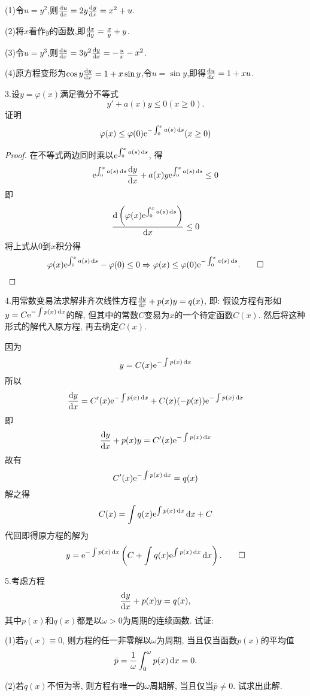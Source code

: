 \begin{solve}
(1)令$u=y^2$,则$\frac{\diff u}{\diff x}=2y\frac{\diff y}{\diff x}=x^2+u$.

(2)将$x$看作$y$的函数,即$\frac{\diff x}{\diff y}=\frac{x}{y}+y$.

(3)令$u=y^3$,则$\frac{\diff u}{\diff x}=3y^2\frac{\diff y}{\diff x}=-\frac{u}{x}-x^2$.

(4)原方程变形为$\cos y\frac{\diff y}{\diff x}=1+x\sin y$,令$u=\sin y$,即得$\frac{\diff u}{\diff x}=1+xu$.
\end{solve}


3.设$y=\varphi(x)$满足微分不等式
\[y'+a(x)y\leq0(x\geq0).\]
证明\[\varphi(x)\leq\varphi(0)\e^{-\int_0^xa(s)\diff s}(x\geq0)\]
\begin{proof} 
在不等式两边同时乘以$\e^{\int_0^xa(s)\diff s}$, 得
\[\e^{\int_0^xa(s)\diff s}\frac{\diff y}{\diff x}+a(x)y\e^{\int_0^xa(s)\diff s}\leq0\]
即\[\frac{\diff\left(\varphi(x)\e^{\int_0^xa(s)\diff s}\right)}{\diff x}\leq0\]
将上式从0到$x$积分得\[\varphi(x)\e^{\int_0^xa(s)\diff s}-\varphi(0)\leq0\Rightarrow\varphi(x)\leq\varphi(0)\e^{-\int_0^xa(s)\diff s}.\qedhere\]
\end{proof}


4.用常数变易法求解非齐次线性方程$\frac{\diff y}{\diff x}+p(x)y=q(x)$, 即: 
假设方程有形如$y=C\e^{-\int p(x)\diff x}$的解, 但其中的常数$C$变易为$x$的一个待定函数$C(x)$. 
然后将这种形式的解代入原方程, 再去确定$C(x)$.

\begin{solve}
因为\[y=C(x)\e^{-\int p(x)\diff x}\]
所以\[\frac{\diff y}{\diff x}=C'(x)\e^{-\int p(x)\diff x}+C(x)(-p(x))\e^{-\int p(x)\diff x}\]
即\[\frac{\diff y}{\diff x}+p(x)y=C'(x)\e^{-\int p(x)\diff x}\]
故有
\[C'(x)\e^{-\int p(x)\diff x}=q(x)\]
解之得\[C(x)=\int q(x)\e^{\int p(x)\diff x}\diff x+C\]
代回即得原方程的解为\[y=\e^{-\int p(x)\diff x}\left(C+\int q(x)\e^{\int p(x)\diff x}\diff x\right).\qedhere\]
\end{solve}


5.考虑方程
\[\frac{\diff y}{\diff x}+p(x)y=q(x),\]
其中$p(x)$和$q(x)$都是以$\omega>0$为周期的连续函数. 试证:

(1)若$q(x)\equiv0$, 则方程的任一非零解以$\omega$为周期, 当且仅当函数$p(x)$的平均值
\[\bar{p}=\frac{1}{\omega}\int_0^{\omega}p(x)\diff x=0.\]

(2)若$q(x)$不恒为零, 则方程有唯一的$\omega$周期解, 当且仅当$\bar{p}\neq0$. 试求出此解.

